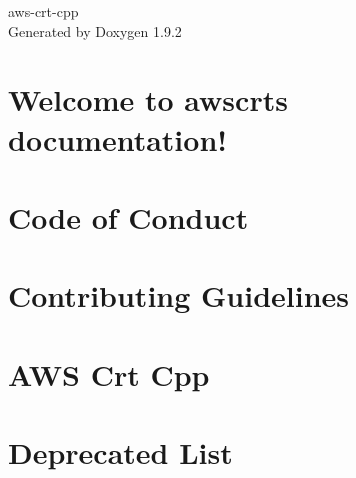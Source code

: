 \documentclass[twoside]{book}
\newcommand{\+}{\discretionary{\mbox{\scriptsize$\hookleftarrow$}}{}{}}
\newcommand{\clearemptydoublepage}{%
    \newpage{\pagestyle{empty}\cleardoublepage}%
  }
\begin{document}
  \raggedbottom
    \hypersetup{pageanchor=false,
                bookmarksnumbered=true,
                pdfencoding=unicode
               }
  \begin{titlepage}
  \vspace*{7cm}
  \begin{center}%
  {\Large aws-\/crt-\/cpp}\\
  \vspace*{1cm}
  {\large Generated by Doxygen 1.9.2}\\
  \end{center}
  \end{titlepage}
  \clearemptydoublepage
  \tableofcontents
  \clearemptydoublepage
  \hypersetup{pageanchor=true}
\chapter{Welcome to awscrt\textquotesingle{}s documentation!}
\label{index}\hypertarget{index}{}
\chapter{Code of Conduct}
\label{md___users_dengket_project_crts_aws_crt_cpp__c_o_d_e__o_f__c_o_n_d_u_c_t}

\chapter{Contributing Guidelines}
\label{md___users_dengket_project_crts_aws_crt_cpp__c_o_n_t_r_i_b_u_t_i_n_g}

\chapter{AWS Crt Cpp}
\label{md___users_dengket_project_crts_aws_crt_cpp__r_e_a_d_m_e}

\chapter{Deprecated List}
\label{deprecated}

\end{document}
